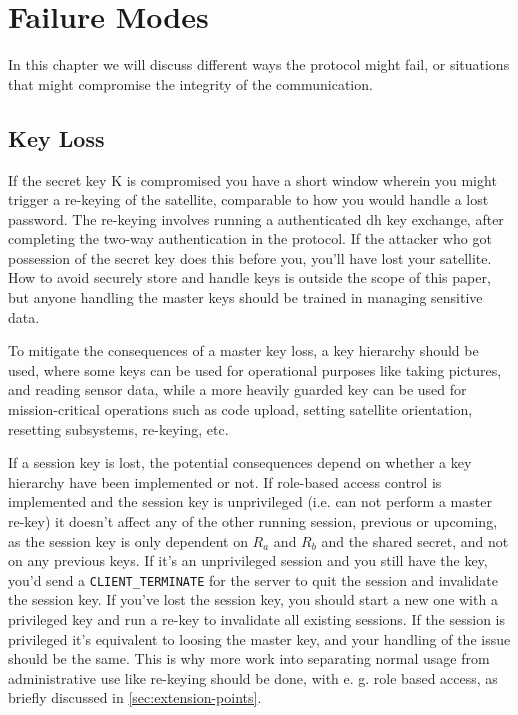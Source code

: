 \chapter{Failure Modes}
\label{chp:failure-modes}

In this chapter we will discuss different ways the protocol might fail, or situations that might compromise the integrity of the communication.

\section{Key Loss}\label{sec:key-loss}

If the secret key K is compromised you have a short window wherein you might trigger a re-keying of the satellite, comparable to how you would handle a lost password. The re-keying involves running a authenticated \gls{dh} key exchange, after completing the two-way authentication in the protocol. If the attacker who got possession of the secret key does this before you, you'll have lost your satellite. How to avoid securely store and handle keys is outside the scope of this paper, but anyone handling the master keys should be trained in managing sensitive data.

To mitigate the consequences of a master key loss, a key hierarchy should be used, where some keys can be used for operational purposes like taking pictures, and reading sensor data, while a more heavily guarded key can be used for mission-critical operations such as code upload, setting satellite orientation, resetting subsystems, re-keying, etc.

If a session key is lost, the potential consequences depend on whether a key hierarchy have been implemented or not. If role-based access control is implemented and the session key is unprivileged (i.e. can not perform a master re-key) it doesn't affect any of the other running session, previous or upcoming, as the session key is only dependent on \( R_a \) and \( R_b \) and the shared secret, and not on any previous keys. If it's an unprivileged session and you still have the key, you'd send a \texttt{CLIENT\_TERMINATE} for the server to quit the session and invalidate the session key. If you've lost the session key, you should start a new one with a privileged key and run a re-key to invalidate all existing sessions. If the session is privileged it's equivalent to loosing the master key, and your handling of the issue should be the same. This is why more work into separating normal usage from administrative use like re-keying should be done, with e. g. role based access, as briefly discussed in \autoref{sec:extension-points}.



